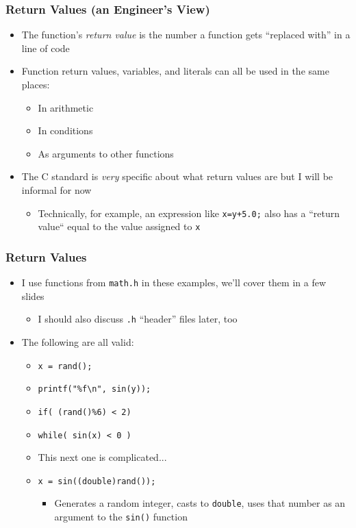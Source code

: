 \documentclass[14pt]{beamer}
\begin{document}
\begin{frame}
\frametitle{Return Values (an Engineer's View)}
\begin{itemize}
\item The function's \textit{return value} is the number a function gets ``replaced with'' in a line of code
\pause
\item Function return values, variables, and literals can all be used in the same places:
	\begin{itemize}
		\item In arithmetic
		\item In conditions
		\item As arguments to other functions
	\end{itemize}	 
\pause
\item The C standard is \textit{very} specific about what return values are but I will be informal for now
	\begin{itemize}
		\item Technically, for example, an expression like \texttt{x=y+5.0;} also has a ``return value`` equal to the value assigned to \texttt{x}
	\end{itemize}
\end{itemize}
\end{frame}

\begin{frame}
\frametitle{Return Values}
\begin{itemize}
\item I use functions from \texttt{math.h} in these examples, we'll cover them in a few slides
	\begin{itemize}
		\item I should also discuss \texttt{.h} ``header'' files later, too
	\end{itemize}
\pause
\item The following are all valid:
	\begin{itemize}
		\item \texttt{x = rand();}
		\item \texttt{printf("\%f\textbackslash n", sin(y));}
		\item \texttt{if( (rand()\%6) < 2)}
		\item \texttt{while( sin(x) < 0 )}
		\pause
		\item This next one is complicated...
		\pause
		\item \texttt{x = sin((double)rand());}
			\begin{itemize}
			\pause
				\item Generates a random integer, casts to \texttt{double}, uses that number as an argument to the \texttt{sin()} function
			\end{itemize}
	\end{itemize}
\end{itemize}
\end{frame}
\end{document}

